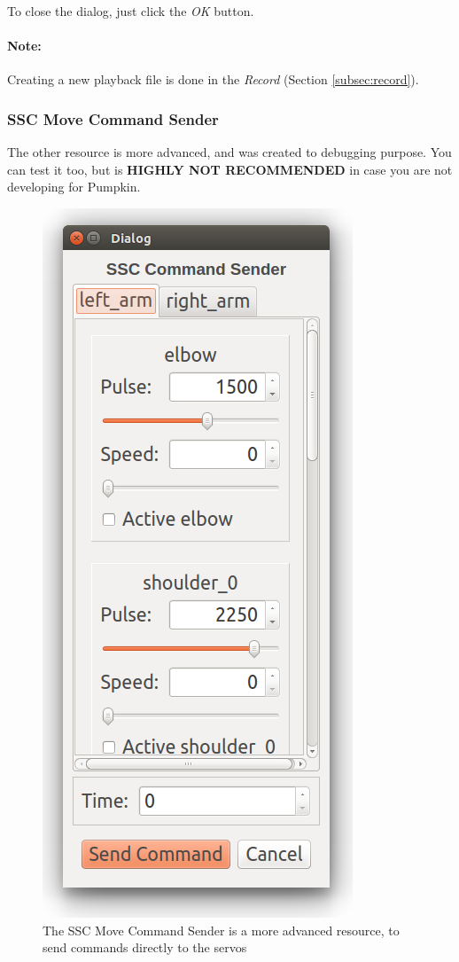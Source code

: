 \documentclass[oneside,a4paper,titlepage]{article}
\begin{document}
To close the dialog, just click the \emph{OK} button.

\paragraph{Note: } Creating a new playback file is done in the \emph{Record} (Section \ref{subsec:record}).

\subsubsection{SSC Move Command Sender}

The other resource is more advanced, and was created to debugging purpose. You can test it too, but is \textbf{\color{red} HIGHLY NOT RECOMMENDED} in case you are not developing for Pumpkin.

\begin{figure}[ht!]
	\centering
	\includegraphics[height=0.5\textheight]{ssc}
	\caption[SSC Move Command Sender]{The SSC Move Command Sender is a more advanced resource, to send commands directly to the servos}
	\label{fig:ssc}
\end{figure}
\end{document}
